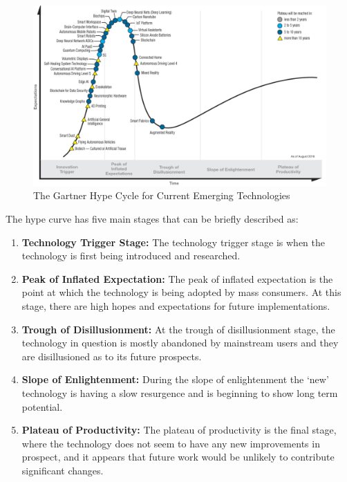 \vspace{0.4cm}

\begin{figure}[H]
      \centering
      \includegraphics[scale=0.3]{background/HypeCurve.png}
      \caption{The Gartner Hype Cycle for Current Emerging Technologies
      \citep{HypeCurve}}
      \label{HypeCurveImg}
\end{figure}


 
The hype curve has five main stages that can be briefly described as:
 
\begin{enumerate}
\item \textbf{Technology Trigger Stage:} The technology trigger stage is when the technology is first being introduced and researched.

\item \textbf{Peak of Inflated Expectation:} The peak of inflated expectation is the point at which the technology is being
adopted by mass consumers. At this stage, there are high hopes and expectations for future implementations.

\item \textbf{Trough of Disillusionment:} At the trough of disillusionment stage, the technology in question is mostly abandoned by mainstream users and they are disillusioned as to its future prospects.

\item \textbf{Slope of Enlightenment:} During the slope of enlightenment the ‘new’ technology is having a slow resurgence and is beginning to show long term potential.

\item \textbf{Plateau of Productivity:} The plateau of productivity is the final stage, where the technology does not seem to have any new improvements in prospect, and it appears that future work would be unlikely to contribute significant changes.
\end{enumerate}

